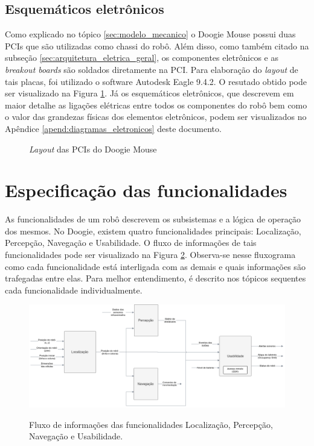 \subsection{Esquemáticos eletrônicos}
\label{ssec:esquematicos_eletronicos}
Como explicado no tópico \ref{sec:modelo_mecanico} o Doogie Mouse possui duas PCIs que são utilizadas como chassi do robô. Além disso, como também citado na subseção \ref{sec:arquitetura_eletrica_geral}, os componentes eletrônicos e as \textit{breakout boards} são soldados diretamente na PCI. Para elaboração do \textit{layout} de tais placas, foi utilizado o software Autodesk Eagle 9.4.2. O resutado obtido pode ser visualizado na Figura \ref{fig:doogie_boards}. Já os esquemáticos eletrônicos, que descrevem em maior detalhe as ligações elétricas entre todos os componentes do robô bem como o valor das grandezas físicas dos elementos eletrônicos, podem ser visualizados no Apêndice \ref{apend:diagramas_eletronicos} deste documento.

\begin{figure}[H]
	\centering
	\caption{\textit{Layout} das PCIs do Doogie Mouse}
	\label{fig:doogie_boards}
\end{figure}

\section{Especificação das funcionalidades}
\label{sec:especificacao_das_funcionalidades}
As funcionalidades de um robô descrevem os subsistemas e a lógica de operação dos mesmos. No Doogie, existem quatro funcionalidades principais: Localização, Percepção, Navegação e Usabilidade. O fluxo de informações de tais funcionalidades pode ser visualizado na Figura \ref{fig:especificacao_funcional_geral}. Observa-se nesse fluxograma como cada funcionalidade está interligada com as demais e quais informações são trafegadas entre elas. Para melhor entendimento, é descrito nos tópicos sequentes cada funcionalidade individualmente.

\begin{figure}[H]
	\centering
	\captionsetup{justification=centering}
	\caption{Fluxo de informações das funcionalidades Localização, Percepção, Navegação e Usabilidade.}
	\includegraphics[width=1\textwidth]
	{Figures/especificacao_funcional_geral}
	\label{fig:especificacao_funcional_geral}
\end{figure}


